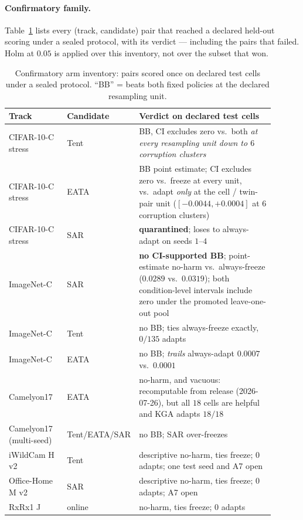 \paragraph{Confirmatory family.} Table~\ref{tab:arm-inventory} lists every (track, candidate) pair
that reached a declared held-out scoring under a sealed protocol, with its verdict --- including the
pairs that failed. Holm at $0.05$ is applied over this inventory, not over the subset that won.

\begin{table}[t]\centering\footnotesize
\caption{Confirmatory arm inventory: pairs scored once on declared test cells under a sealed
protocol. ``BB'' = beats both fixed policies at the declared resampling unit.}
\label{tab:arm-inventory}
\begin{tabular}{@{}p{0.22\linewidth}p{0.16\linewidth}p{0.52\linewidth}@{}}
\toprule
Track & Candidate & Verdict on declared test cells \\
\midrule
CIFAR-10-C stress & Tent & BB, CI excludes zero vs.\ both \emph{at every resampling unit down to $6$ corruption clusters} \\
CIFAR-10-C stress & EATA & BB point estimate; CI excludes zero vs.\ freeze at every unit, vs.\ adapt \emph{only} at the cell / twin-pair unit ($[-0.0044,+0.0004]$ at $6$ corruption clusters) \\
CIFAR-10-C stress & SAR & \textbf{quarantined}; loses to always-adapt on seeds $1$--$4$ \\
ImageNet-C & SAR & \textbf{no CI-supported BB}; point-estimate no-harm vs.\ always-freeze ($0.0289$ vs.\ $0.0319$); both condition-level intervals include zero under the promoted leave-one-out pool \\
ImageNet-C & Tent & no BB; ties always-freeze exactly, $0/135$ adapts \\
ImageNet-C & EATA & no BB; \emph{trails} always-adapt $0.0007$ vs.\ $0.0001$ \\
Camelyon17 & EATA & no-harm, and vacuous: recomputable from release (2026-07-26), but all $18$ cells are helpful and KGA adapts $18/18$ \\
Camelyon17 (multi-seed) & Tent/EATA/SAR & no BB; SAR over-freezes \\
iWildCam H v2 & Tent & descriptive no-harm, ties freeze; $0$ adapts; one test seed and A7 open \\
Office-Home M v2 & SAR & descriptive no-harm, ties freeze; $0$ adapts; A7 open \\
RxRx1 J & online & no-harm, ties freeze; $0$ adapts \\

\end{tabular}
\end{table}
